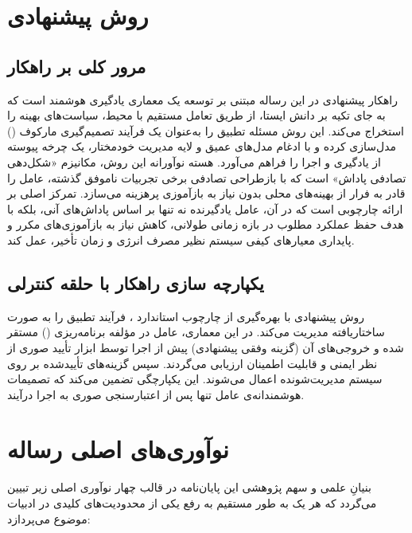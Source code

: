 \documentclass[oneside,openany,phd]{TMU-Thesis}
\begin{document}
\section{روش پیشنهادی}

\subsection{مرور کلی بر راهکار }

راهکار پیشنهادی در این رساله مبتنی بر توسعه یک معماری یادگیری هوشمند است که به جای تکیه بر دانش ایستا، از طریق تعامل مستقیم با محیط، سیاست‌های بهینه را استخراج می‌کند. این روش مسئله تطبیق را به‌عنوان یک فرآیند تصمیم‌گیری مارکوف () مدل‌سازی کرده و با ادغام مدل‌های عمیق و لایه مدیریت خودمختار، یک چرخه پیوسته از یادگیری و اجرا را فراهم می‌آورد. هسته نوآورانه این روش، مکانیزم «شکل‌دهی تصادفی پاداش» است که با بازطراحی تصادفی برخی تجربیات ناموفق گذشته، عامل را قادر به فرار از بهینه‌های محلی بدون نیاز به بازآموزی پرهزینه می‌سازد. تمرکز اصلی بر ارائه چارچوبی است که در آن، عامل یادگیرنده نه تنها بر اساس پاداش‌های آنی، بلکه با هدف حفظ عملکرد مطلوب در بازه زمانی طولانی، کاهش نیاز به بازآموزی‌های مکرر و پایداری معیارهای کیفی سیستم نظیر مصرف انرژی و زمان تأخیر، عمل کند.

\subsection{یکپارچه سازی راهکار  با حلقه کنترلی }

روش پیشنهادی با بهره‌گیری از چارچوب استاندارد ، فرآیند تطبیق را به صورت ساختاریافته مدیریت می‌کند. در این معماری، عامل  در مؤلفه برنامه‌ریزی () مستقر شده و خروجی‌های آن (گزینه وفقی پیشنهادی) پیش از اجرا توسط ابزار تأیید صوری  از نظر ایمنی و قابلیت اطمینان ارزیابی می‌گردند. سپس گزینه‌های تأییدشده بر روی سیستم مدیریت‌شونده اعمال می‌شوند. این یکپارچگی تضمین می‌کند که تصمیمات هوشمندانه‌ی عامل  تنها پس از اعتبارسنجی صوری به اجرا درآیند.

\section{نوآوری‌های اصلی رساله}

بنیانِ علمی و سهم پژوهشی این پایان‌نامه در قالب چهار نوآوری اصلی زیر تبیین می‌گردد که هر یک به طور مستقیم به رفع یکی از محدودیت‌های کلیدی در ادبیات موضوع می‌پردازد:
\end{document}
